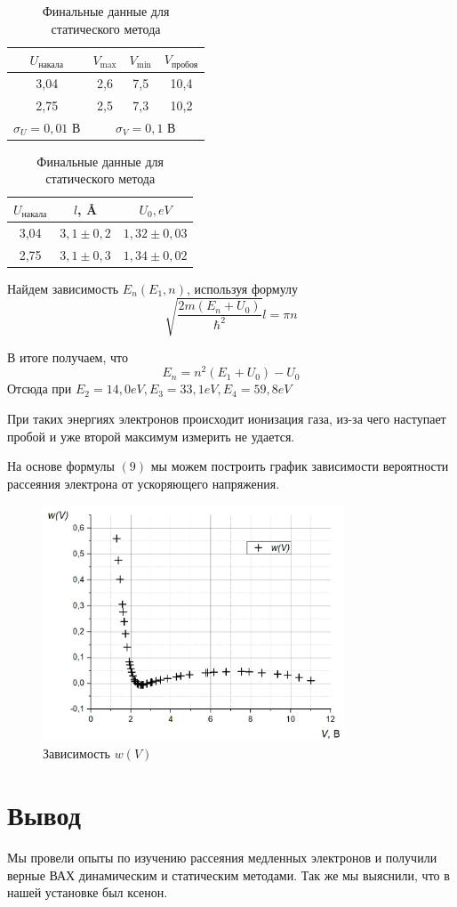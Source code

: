 \documentclass[a4paper, 12pt]{article}%
\begin{document}
\begin{table}[h]
\begin{center}
\begin{tabular}{|c|c|c|c|}
\hline
$U_{\text{накала}}$ &  $V_{\max}$ &  $V_{\min}$ &  $V_{\text{пробоя}}$ \\ \hline
3,04                & 2,6                               & 7,5                               & 10,4                                       \\ \hline
2,75                & 2,5                               & 7,3                               & 10,2                                       \\ \hline
$\sigma_U = 0,01$ В & \multicolumn{3}{c|}{$\sigma_V = 0,1$ В}                                                                            \\ \hline
\end{tabular}
\caption{разные напряжения для статического метода}
\begin{tabular}{|c|c|c|}
\hline
$U_{\text{накала}}$ & $l$, \AA & $U_0, eV$     \\ \hline
3,04                & $3,1\pm0,2$             & $1,32\pm0,03$ \\ \hline
2,75                & $3,1\pm0,3$             & $1,34\pm0,02$ \\ \hline
\end{tabular}
\caption{Финальные данные для статического метода}
\end{center}
\end{table}

Найдем зависимость $E_n(E_1, n)$, используя формулу 
\[\sqrt{\frac{2m(E_n + U_0)}{\hbar^2}}l = \pi n\]	

В итоге получаем, что 
\[E_n = n^2(E_1 + U_0) - U_0\]
Отсюда при $E_2 = 14,0 eV, E_3 = 33,1 eV, E_4 =59,8 eV$ 

При таких энергиях электронов происходит ионизация газа, из-за чего наступает пробой и уже второй максимум измерить не удается.

На основе формулы $(9)$ мы можем построить график зависимости вероятности рассеяния электрона от ускоряющего напряжения.
\newpage
\begin{figure}[h]
\begin{center}
\includegraphics[width = 0.8\textwidth]{7.jpg}
\caption{Зависимость $w(V)$}
\end{center}
\end{figure}
\section*{Вывод}
Мы провели опыты по изучению рассеяния медленных электронов и получили верные ВАХ динамическим и статическим методами. Так же мы выяснили, что в нашей установке был ксенон.
\end{document}
